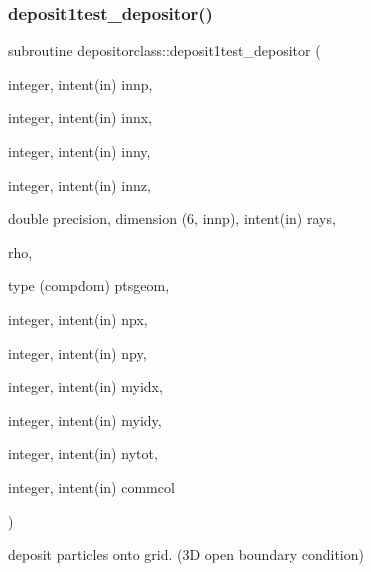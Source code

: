 \subsubsection{\texorpdfstring{deposit1test\_depositor()}{deposit1test\_depositor()}}
{\footnotesize\ttfamily subroutine depositorclass\+::deposit1test\+\_\+depositor (\begin{DoxyParamCaption}\item[{integer, intent(in)}]{innp,  }\item[{integer, intent(in)}]{innx,  }\item[{integer, intent(in)}]{inny,  }\item[{integer, intent(in)}]{innz,  }\item[{double precision, dimension (6, innp), intent(in)}]{rays,  }\item[{}]{rho,  }\item[{type (compdom)}]{ptsgeom,  }\item[{integer, intent(in)}]{npx,  }\item[{integer, intent(in)}]{npy,  }\item[{integer, intent(in)}]{myidx,  }\item[{integer, intent(in)}]{myidy,  }\item[{integer, intent(in)}]{nytot,  }\item[{integer, intent(in)}]{commcol }\end{DoxyParamCaption})}



deposit particles onto grid. (3D open boundary condition) 

